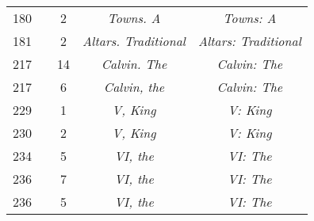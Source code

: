 \documentclass[a4paper,11pt]{article}
\begin{document}
\begin{center}
\begin{tabular}{|c|c|c|c|c|}
    180 & &  2 & \emph{Towns. A} & \emph{Towns: A} \\
    181 & &  2 & \emph{Altars. Traditional} & \emph{Altars: Traditional} \\
    217 & & 14 & \emph{Calvin. The} & \emph{Calvin: The} \\
    217 & &  6 & \emph{Calvin, the} & \emph{Calvin: The} \\
    229 & &  1 & \emph{V, King} & \emph{V: King} \\
    230 & &  2 & \emph{V, King} & \emph{V: King} \\
    234 & &  5 & \emph{VI, the} & \emph{VI: The} \\
    236 & &  7 & \emph{VI, the} & \emph{VI: The} \\
    236 & &  5 & \emph{VI, the} & \emph{VI: The} \\
    \hline
  \end{tabular}



\end{center}
\end{document}
